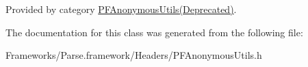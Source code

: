 Provided by category \hyperlink{category_p_f_anonymous_utils_07_deprecated_08_adb7100f944decabec118d86332ca1312}{P\+F\+Anonymous\+Utils(\+Deprecated)}.



The documentation for this class was generated from the following file\+:\begin{DoxyCompactItemize}
\item 
Frameworks/\+Parse.\+framework/\+Headers/P\+F\+Anonymous\+Utils.\+h\end{DoxyCompactItemize}
